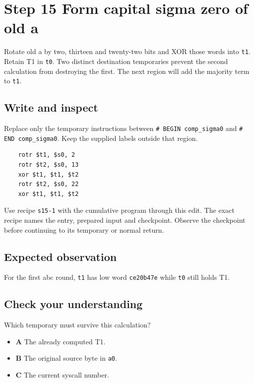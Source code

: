 \section{Step 15 Form capital sigma zero of old a}\label{sha-s15}

Rotate old a by two, thirteen and twenty-two bits and XOR those words into \texttt{t1}. Retain T1 in \texttt{t0}. Two distinct destination temporaries prevent the second calculation from destroying the first. The next region will add the majority term to \texttt{t1}.

\subsection{Write and inspect}
Replace only the temporary instructions between \texttt{\# BEGIN comp\_sigma0} and \texttt{\# END comp\_sigma0}. Keep the supplied labels outside that region.

\begin{verbatim}
    rotr $t1, $s0, 2
    rotr $t2, $s0, 13
    xor $t1, $t1, $t2
    rotr $t2, $s0, 22
    xor $t1, $t1, $t2
\end{verbatim}

Use recipe \texttt{s15-1} with the cumulative program through this edit. The exact recipe names the entry, prepared input and checkpoint. Observe the checkpoint before continuing to its temporary or normal return.

\subsection{Expected observation}
For the first abc round, \texttt{t1} has low word \texttt{ce20b47e} while \texttt{t0} still holds T1.

\subsection{Check your understanding}
Which temporary must survive this calculation?

\begin{itemize}
  \item \textbf{A} The already computed T1.
  \item \textbf{B} The original source byte in \texttt{a0}.
  \item \textbf{C} The current syscall number.
\end{itemize}
